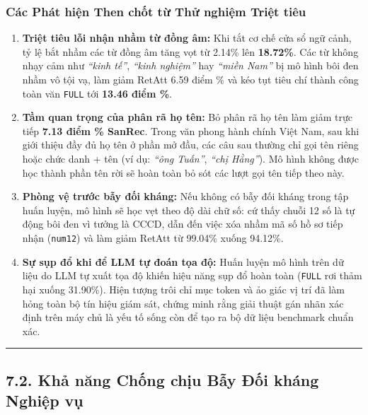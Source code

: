 \documentclass[
  11pt,
  a4paper,
]{article}
\providecommand{\tightlist}{%
  \setlength{\itemsep}{0pt}\setlength{\parskip}{0pt}}
\begin{document}
\subsubsection{Các Phát hiện Then chốt từ Thử nghiệm Triệt
tiêu}\label{cuxe1c-phuxe1t-hiux1ec7n-then-chux1ed1t-tux1eeb-thux1eed-nghiux1ec7m-triux1ec7t-tiuxeau}

\begin{enumerate}
\def\labelenumi{\arabic{enumi}.}
\tightlist
\item
  \textbf{Triệt tiêu lỗi nhận nhầm từ đồng âm:} Khi tắt cơ chế cửa sổ ngữ cảnh, tỷ lệ bắt nhầm các
  từ đồng âm tăng vọt từ 2.14\% lên \textbf{18.72\%}. Các từ không nhạy cảm như \emph{``kinh tế''},
  \emph{``kinh nghiệm''} hay \emph{``miền Nam''} bị mô hình bôi đen nhầm vô tội vạ, làm giảm RetAtt
  6.59 điểm \% và kéo tụt tiêu chí thành công toàn văn \texttt{FULL} tới \textbf{13.46 điểm \%}.
\item
  \textbf{Tầm quan trọng của phân rã họ tên:} Bỏ phân rã họ tên làm giảm trực tiếp \textbf{7.13 điểm
  \% SanRec}. Trong văn phong hành chính Việt Nam, sau khi giới thiệu đầy đủ họ tên ở phần mở đầu,
  các câu sau thường chỉ gọi tên riêng hoặc chức danh + tên (ví dụ: \emph{``ông Tuấn''}, \emph{``chị
  Hằng''}). Mô hình không được học thành phần tên rời sẽ hoàn toàn bỏ sót các lượt gọi tên tiếp theo
  này.
\item
  \textbf{Phòng vệ trước bẫy đối kháng:} Nếu không có bẫy đối kháng trong tập huấn luyện, mô hình sẽ
  học vẹt theo độ dài chữ số: cứ thấy chuỗi 12 số là tự động bôi đen vì tưởng là CCCD, dẫn đến việc
  xóa nhầm mã số hồ sơ tiếp nhận (\texttt{num12}) và làm giảm RetAtt từ 99.04\% xuống 94.12\%.
\item
  \textbf{Sự sụp đổ khi để LLM tự đoán tọa độ:} Huấn luyện mô hình trên dữ liệu do LLM tự xuất tọa
  độ khiến hiệu năng sụp đổ hoàn toàn (\texttt{FULL} rơi thảm hại xuống 31.90\%). Hiện tượng trôi
  chỉ mục token và ảo giác vị trí đã làm hỏng toàn bộ tín hiệu giám sát, chứng minh rằng giải thuật
  gán nhãn xác định trên máy chủ là yếu tố sống còn để tạo ra bộ dữ liệu benchmark chuẩn xác.
\end{enumerate}

\begin{center}\rule{0.5\linewidth}{0.5pt}\end{center}

\subsection{7.2. Khả năng Chống chịu Bẫy Đối kháng Nghiệp
vụ}\label{khux1ea3-nux103ng-chux1ed1ng-chux1ecbu-bux1eaby-ux111ux1ed1i-khuxe1ng-nghiux1ec7p-vux1ee5}
\end{document}

